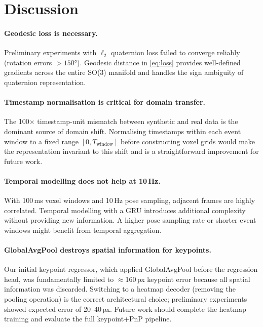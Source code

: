 \documentclass[10pt,twocolumn,letterpaper]{article}
\begin{document}
\section{Discussion}
\label{sec:discussion}

\paragraph{Geodesic loss is necessary.}
Preliminary experiments with $\ell_2$ quaternion loss failed to
converge reliably (rotation errors $> 150°$).  Geodesic distance in
\cref{eq:loss} provides well-defined gradients across the entire
SO(3) manifold and handles the sign ambiguity of quaternion
representation.

\paragraph{Timestamp normalisation is critical for domain transfer.}
The 100$\times$ timestamp-unit mismatch between synthetic and real data
is the dominant source of domain shift.  Normalising timestamps within
each event window to a fixed range $[0, T_{\text{window}}]$ before
constructing voxel grids would make the representation invariant to
this shift and is a straightforward improvement for future work.

\paragraph{Temporal modelling does not help at 10\,Hz.}
With 100\,ms voxel windows and 10\,Hz pose sampling, adjacent frames
are highly correlated.  Temporal modelling with a GRU introduces
additional complexity without providing new information.  A higher
pose sampling rate or shorter event windows might benefit from
temporal aggregation.

\paragraph{GlobalAvgPool destroys spatial information for keypoints.}
Our initial keypoint regressor, which applied GlobalAvgPool before the
regression head, was fundamentally limited to $\approx$160\,px
keypoint error because all spatial information was discarded.
Switching to a heatmap decoder (removing the pooling operation)
is the correct architectural choice; preliminary experiments showed
expected error of 20–40\,px.  Future work should complete the
heatmap training and evaluate the full keypoint+PnP pipeline.
\end{document}
